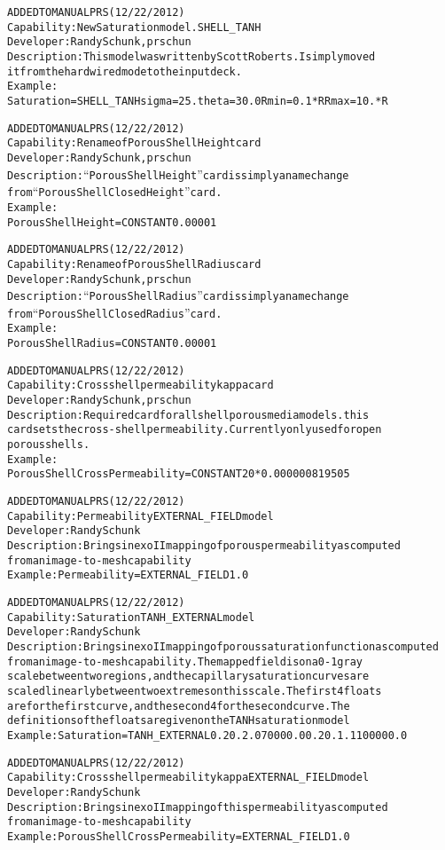\documentclass{article}
\begin{document}
\begin{alltt}
ADDED TO MANUAL PRS (12/22/2012)
Capability: New Saturation model. SHELL_TANH
Developer: Randy Schunk, prschun
Description: This model was written by Scott Roberts. I simply moved
it from the hardwired mode to the input deck.    
Example:
Saturation = SHELL_TANH {sigma=25.} {theta=30.0} {Rmin =0.1*R} {Rmax = 10.*R}

ADDED TO MANUAL PRS (12/22/2012)
Capability:  Rename of Porous Shell Height card
Developer: Randy Schunk, prschun
Description: ``Porous Shell Height'' card is simply a name change
from ``Porous Shell Closed Height'' card.  
Example: 
Porous Shell Height               = CONSTANT 0.00001

ADDED TO MANUAL PRS (12/22/2012)
Capability:  Rename of Porous Shell Radius card
Developer: Randy Schunk, prschun
Description: ``Porous Shell Radius'' card is simply a name change
from ``Porous Shell Closed Radius'' card.  
Example: 
Porous Shell Radius              = CONSTANT 0.00001

ADDED TO MANUAL PRS (12/22/2012)
Capability:  Cross shell permeability kappa card
Developer: Randy Schunk, prschun
Description: Required card for all shell porous media models.  this
card sets the cross-shell permeability. Currently only used for open
porous shells. 
Example: 
Porous Shell Cross Permeability = CONSTANT {20*0.000000819505}

ADDED TO MANUAL PRS (12/22/2012)
Capability:  Permeability  EXTERNAL_FIELD model
Developer: Randy Schunk
Description:  Brings in exoII mapping of porous permeability as computed
from an image-to-mesh capability
Example: Permeability   = EXTERNAL_FIELD {1.0}

ADDED TO MANUAL PRS (12/22/2012)
Capability:  Saturation TANH_EXTERNAL model
Developer: Randy Schunk
Description:  Brings in exoII mapping of porous saturation function as computed
from an image-to-mesh capability. The mapped field is on a 0-1 gray
scale between two regions, and the capillary saturation curves are
scaled linearly between two extremes on this scale. The first 4 floats
are for the first curve, and the second 4 for the second curve.  The
definitions of the floats are given on the TANH saturation model 
Example: Saturation = TANH_EXTERNAL 0.2 0. 2.0 70000.0 0.2 0. 1.1 100000.0


ADDED TO MANUAL PRS (12/22/2012)
Capability:  Cross shell permeability kappa EXTERNAL_FIELD model
Developer: Randy Schunk
Description:  Brings in exoII mapping of this permeability as computed
from an image-to-mesh capability
Example: Porous Shell Cross Permeability   = EXTERNAL_FIELD {1.0}


\end{alltt}
\end{document}
